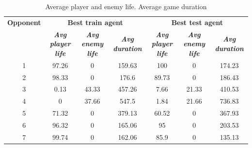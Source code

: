 \documentclass[conference]{IEEEtran}
\begin{document}
    \begin{table}[htbp]
        \caption{Average player and enemy life. Average game duration}
        \begin{center}
            \begin{tabular}{|c|c|c|c|c|c|c|}
                \hline
                \textbf{Opponent} & \multicolumn{3}{|c|}{\textbf{Best train agent}} & \multicolumn{3}{|c|}{\textbf{Best test agent}} \\
                \cline{2-7}
                & \textbf{\textit{Avg player life}} & \textbf{\textit{Avg enemy life}} & \textbf{\textit{Avg duration}} & \textbf{\textit{Avg player life}} & \textbf{\textit{Avg enemy life}} & \textbf{\textit{Avg duration}} \\
                \hline
                1                & 97.26                             & 0                                & 159.63                         & 100                               & 0                                & 174.23                         \\
                2                & 98.33                             & 0                                & 176.6                          & 89.73                             & 0                                & 186.43                         \\
                3                & 0.13                              & 43.33                            & 457.26                         & 7.66                              & 21.33                            & 410.53                         \\
                4                & 0                                 & 37.66                            & 547.5                          & 1.84                              & 21.66                            & 736.83                         \\
                5                & 71.32                             & 0                                & 379.13                         & 60.52                             & 0                                & 367.93                         \\
                6                & 96.32                             & 0                                & 165.06                         & 95                                & 0                                & 203.53                         \\
                7                & 99.74                             & 0                                & 162.06                         & 85.9                              & 0                                & 135.13                         \\

\end{tabular}
\end{center}
\end{table}
\end{document}
